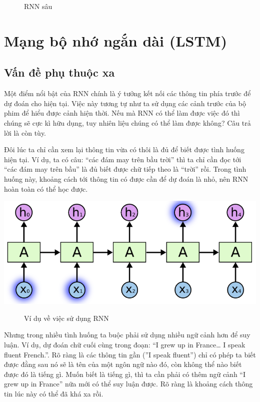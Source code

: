\begin{itemize}
\begin{center}
\begin{figure}[htp]
\begin{center}
    \end{center}
    \caption{RNN sâu}
    \end{figure}
    \end{center}
\end{itemize}


\section{Mạng bộ nhớ ngắn dài (LSTM)}
\subsection{Vấn đề phụ thuộc xa}
Một điểm nổi bật của RNN chính là ý tưởng kết nối các thông tin phía trước để dự đoán cho hiện tại. Việc này tương tự như ta sử dụng các cảnh trước của bộ phim để hiểu được cảnh hiện thời. Nếu mà RNN có thể làm được việc đó thì chúng sẽ cực kì hữu dụng, tuy nhiên liệu chúng có thể làm được không? Câu trả lời là còn tùy.

Đôi lúc ta chỉ cần xem lại thông tin vừa có thôi là đủ để biết được tình huống hiện tại. Ví dụ, ta có câu: “các đám may trên bầu trời” thì ta chỉ cần đọc tới “các đám may trên bầu” là đủ biết được chữ tiếp theo là “trời” rồi. Trong tình huống này, khoảng cách tới thông tin có được cần để dự đoán là nhỏ, nên RNN hoàn toàn có thể học được.
\begin{center}
    \includegraphics[scale=.3]{image/chapter6/ptx1.png}
    \begin{figure}[htp]
    \begin{center}
     
    \end{center}
    \caption{Ví dụ về việc sử dụng RNN}
    \end{figure}
\end{center}
Nhưng trong nhiều tình huống ta buộc phải sử dụng nhiều ngữ cảnh hơn để suy luận. Ví dụ, dự đoán chữ cuối cùng trong đoạn: “I grew up in France… I speak fluent French.”. Rõ ràng là các thông tin gần (”I speak fluent”) chỉ có phép ta biết được đằng sau nó sẽ là tên của một ngôn ngữ nào đó, còn không thể nào biết được đó là tiếng gì. Muốn biết là tiếng gì, thì ta cần phải có thêm ngữ cảnh “I grew up in France” nữa mới có thể suy luận được. Rõ ràng là khoảng cách thông tin lúc này có thể đã khá xa rồi.

